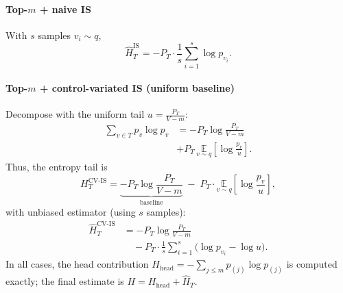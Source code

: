 \documentclass[11pt]{article}
\begin{document}
\paragraph{Top-$m$ + naive IS} With $s$ samples $v_i\!\sim q$,
\[
	\widehat{H}_T^{\text{IS}}
	= -P_T \cdot \frac{1}{s}\sum_{i=1}^s \log p_{v_i}.
\]
\paragraph{Top-$m$ + control-variated IS (uniform baseline)}
Decompose with the uniform tail $u=\tfrac{P_T}{V-m}$:
\begin{align*}
	\sum_{v\in T} p_v \log p_v
	 & = -P_T\log\!\frac{P_T}{V-m}                                               \\
	 & + P_T\,\underset{v\sim q}{\mathbb{E}}\!\left[\log\!\frac{p_v}{u}\right].
\end{align*}
Thus, the entropy tail is
\[
	H_T^{\text{CV-IS}}
	= \underbrace{-P_T\log\!\frac{P_T}{V-m}}_{\text{baseline}}
	\;-\; P_T \cdot \underset{v\sim q}{\mathbb{E}}\!\left[\log\!\frac{p_v}{u}\right],
\]
with unbiased estimator (using $s$ samples):
\begin{align*}
	\widehat{H}_T^{\text{CV-IS}}
	 & = -P_T\log\!\frac{P_T}{V-m}                                                 \\
	 & \quad - P_T \cdot \frac{1}{s}\sum_{i=1}^s \Big(\log p_{v_i} - \log u\Big).
\end{align*}
In all cases, the head contribution $H_{\text{head}}=-\sum_{j\le m}p_{(j)}\log p_{(j)}$ is computed exactly; the final estimate is $H=H_{\text{head}}+\widehat{H}_T$.
\end{document}
